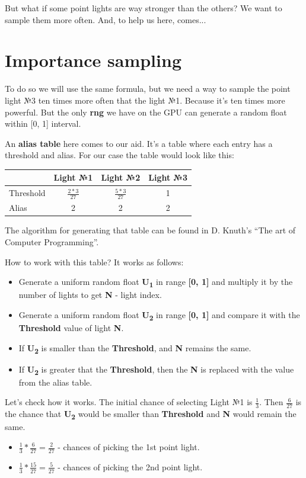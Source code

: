 \documentclass{article}
\begin{document}
But what if some point lights are way stronger than the others? We want to sample them more often. And, to help us here, comes...
\section{Importance sampling}

To do so we will use the same formula, but we need a way to sample the point light №3 ten times more often that the light №1. Because it's ten times more powerful.
But the only \textbf{rng} we have on the GPU can generate a random float within [0, 1] interval.

An \textbf{alias table} here comes to our aid. It's a table where each entry has a threshold and alias. For our case the table would look like this:

\begin{center}
  \begin{tabular}{ | l | c | c | c | }
    \hline
    &Light №1 & Light №2 & Light №3 \\ \hline
    Threshold & $\frac{2 * 3}{27}$ & $\frac{5 * 3}{27}$ & 1 \\ \hline
    Alias & 2 & 2 & 2 \\
    \hline
  \end{tabular}
\end{center}

The algorithm for generating that table can be found in D. Knuth's ``The art of Computer Programming''.

How to work with this table?
It works as follows:
\begin{itemize}
    \item Generate a uniform random float \textbf{U\textsubscript{1}} in range \textbf{[0, 1]} and multiply it by the number of lights to get \textbf{N} - light index.
    \item Generate a uniform random float \textbf{U\textsubscript{2}} in range \textbf{[0, 1]} and compare it with the \textbf{Threshold} value of light \textbf{N}.
    \item If \textbf{U\textsubscript{2}} is smaller than the \textbf{Threshold}, and \textbf{N} remains the same.
    \item If \textbf{U\textsubscript{2}} is greater that the \textbf{Threshold}, then the \textbf{N} is replaced with the value from the alias table.
\end{itemize}

Let's check how it works. The initial chance of selecting Light №1 is $\frac{1}{3}$. Then $\frac{6}{27}$ is the chance that \textbf{U\textsubscript{2}} would be smaller than \textbf{Threshold} and \textbf{N} would remain the same.
\begin{itemize}
    \item $\frac{1}{3} * \frac{6}{27} = \frac{2}{27} $ - chances of picking the 1st point light.
    \item $\frac{1}{3} * \frac{15}{27} = \frac{5}{27} $ - chances of picking the 2nd point light.
\end{itemize}
\end{document}
